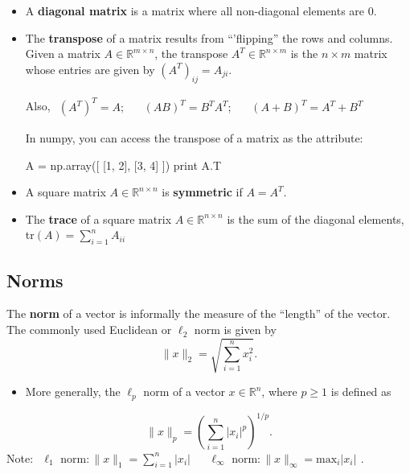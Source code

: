 \begin{itemize}
\item A {\bf diagonal matrix} is a matrix where all non-diagonal elements are $0$.


\item The {\bf transpose} of a matrix results from ``'flipping'' the rows and columns. 
Given a matrix $A \in \mathbb{R}^{m\times n}$, the transpose $A^{T} \in \mathbb{R}^{n\times m}$
is the $n \times m$ matrix whose entries are given by $(A^{T})_{ij}= A_{ji}$.

Also, $\begin{array}{ccccc}(A^{T})^{T}= A; &  & (AB)^{T}=B^{T}A^{T}; & & (A+B)^{T}= A^{T}+B^{T} \end{array}$

In numpy, you can access the transpose of a matrix as the  attribute:

\begin{python}
A = np.array([ [1, 2], [3, 4] ])
print A.T
\end{python}

\item A square matrix $A \in \mathbb{R}^{n\times n}$ is {\bf symmetric} if  $A=A^{T}$.

\item The {\bf trace} of a square matrix $A \in \mathbb{R}^{n\times n}$ is the sum of the diagonal
elements, tr$(A)= \sum\limits_{i=1}^{n} A_{ii}$

\end{itemize}
\subsection{Norms}
The {\bf norm} of a vector is informally the measure of the ``length'' of the vector. The commonly used Euclidean or $\ell_{2}$ norm is given by
\begin{equation*}
\|x\|_{2}=\sqrt{\sum\limits_{i=1}^{n} x_{i}^{2}}.
\end{equation*}

\begin{itemize}
\item More generally, the $\ell_{p}$ norm of a vector $x \in \mathbb{R}^{n}$, where $p \geq 1$ is defined as 
\end{itemize}
\begin{equation*}
\|x\|_{p}=\left(\sum\limits_{i=1}^{n}|x_{i}|^{p}\right)^{1/p}.
\end{equation*}
Note: $\begin{array}{ccc} \ell_{1} \text{ norm}: \|x\|_{1} = \sum\limits_{i=1}^{n} |x_{i}| && \ell_{\infty} \text{ norm}: \|x\|_{\infty} = \text{max}_{i} |x_{i}| \end{array}$.

